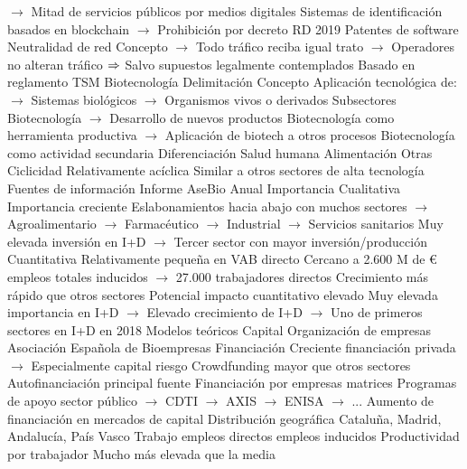 \documentclass{nuevotema}
\begin{document}
\begin{esquemal}
				\4[] $\to$ Mitad de servicios públicos por medios digitales
				\4[] Sistemas de identificación basados en blockchain
				\4[] $\to$ Prohibición por decreto RD 2019
				\4 Patentes de software
				\4 Neutralidad de red
				\4[] Concepto
				\4[] $\to$ Todo tráfico reciba igual trato
				\4[] $\to$ Operadores no alteran tráfico
				\4[] $\Rightarrow$ Salvo supuestos legalmente contemplados
				\4[] Basado en reglamento TSM
		\2 Biotecnología
			\3 Delimitación
				\4 Concepto
				\4[] Aplicación tecnológica de:
				\4[] $\to$ Sistemas biológicos
				\4[] $\to$ Organismos vivos o derivados
				\4 Subsectores
				\4[] Biotecnología
				\4[] $\to$ Desarrollo de nuevos productos
				\4[] Biotecnología como herramienta productiva
				\4[] $\to$ Aplicación de biotech a otros procesos
				\4[] Biotecnología como actividad secundaria
				\4 Diferenciación
				\4[] Salud humana
				\4[] Alimentación
				\4[] Otras
				\4 Ciclicidad
				\4[] Relativamente acíclica
				\4[] Similar a otros sectores de alta tecnología
				\4 Fuentes de información
				\4[] Informe AseBio Anual
			\3 Importancia
				\4 Cualitativa
				\4[] Importancia creciente
				\4[] Eslabonamientos hacia abajo con muchos sectores
				\4[] $\to$ Agroalimentario
				\4[] $\to$ Farmacéutico
				\4[] $\to$ Industrial
				\4[] $\to$ Servicios sanitarios
				\4[] Muy elevada inversión en I+D
				\4[] $\to$ Tercer sector con mayor inversión/producción
				\4 Cuantitativa
				\4[] Relativamente pequeña en VAB directo
				\4[] \4[] Cercano a 2.600 M de €
				 empleos totales inducidos
				\4[] $\to$ 27.000 trabajadores directos
				\4[] Crecimiento más rápido que otros sectores
				\4[] Potencial impacto cuantitativo elevado
				\4[] Muy elevada importancia en I+D
				\4[] $\to$ Elevado crecimiento de I+D
				\4[] $\to$ Uno de primeros sectores en I+D en 2018
			\3 Modelos teóricos
			\3 Capital
				\4 Organización de empresas
				\4[] Asociación Española de Bioempresas
				\4 Financiación
				\4[] Creciente financiación privada
				\4[] $\to$ Especialmente capital riesgo
				\4[] Crowdfunding mayor que otros sectores
				\4[] Autofinanciación principal fuente
				\4[] Financiación por empresas matrices
				\4[] Programas de apoyo sector público
				\4[] $\to$ CDTI
				\4[] $\to$ AXIS
				\4[] $\to$ ENISA
				\4[] $\to$ ...
				\4[] Aumento de financiación en mercados de capital
				\4 Distribución geográfica
				\4[] Cataluña, Madrid, Andalucía, País Vasco
			\3 Trabajo
				 empleos directos
				 empleos inducidos
				\4 Productividad por trabajador
				\4[] Mucho más elevada que la media

\end{esquemal}
\end{document}
